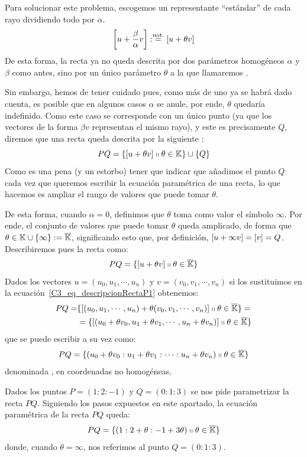 Para solucionar este problema, escogemos un representante ``estándar'' de cada rayo dividiendo todo por $\alpha$.
\[\left [ u+\frac{\beta}{\alpha}v \right ]:\stackrel{\textrm{not.}}{=}\left [ u+\theta v \right ]\]
De esta forma, la recta ya no queda descrita por dos parámetros homogéneos $\alpha$ y $\beta$ como antes, sino por un único parámetro $\theta$ a la que llamaremos .
	
Sin embargo, hemos de tener cuidado pues, como más de uno ya se habrá dado cuenta, es posible que en algunos casos $\alpha$ se anule, por ende, $\theta$ quedaría indefinido. Como este caso se corresponde con un único punto (ya que los vectores de la forma $\beta v$ representan el mismo rayo), y este es precisamente $Q$, diremos que una recta queda descrita por la siguiente :
\begin{equation}
	\label{C3_eq_descripcionRecta}
	PQ=\{\left [ u+\theta v \right ]\shortparallel \theta\in\mathbb{K}\}\cup\{Q\}
\end{equation}
Como es una pena (y un estorbo) tener que indicar que añadimos el punto $Q$ cada vez que queremos escribir la ecuación paramétrica de una recta, lo que hacemos es ampliar el rango de valores que puede tomar $\theta$.

De esta forma, cuando $\alpha=0$, definimos que $\theta$ toma como valor el símbolo $\infty$. Por ende, el conjunto de valores que puede tomar $\theta$ queda amplicado, de forma que $\theta\in\mathbb{K}\cup\{\infty\}:=\overline{\mathbb{K}}$, significando esto que, por definición, $\left [ u+\infty v \right ]=\left [ v \right ]=Q$. Describiremos pues la recta como:
\begin{equation}
	\label{C3_eq_descripcionRectaP1}
	PQ=\{\left [ u+\theta v \right ]\shortparallel \theta\in\overline{\mathbb{K}}\}
\end{equation}
Dados los vectores $u=(u_0,u_1,\cdots,u_n)$ y $v=(v_0,v_1,\cdots,v_n)$ si los sustituimos en la ecuación~\eqref{C3_eq_descripcionRectaP1} obtenemos:
\begin{equation*}
	\label{C_3_eq_parametrica_recta}
	\begin{split}
		PQ=&\{\left [ (u_0,u_1,\cdots,u_n)+\theta(v_0,v_1,\cdots,v_n) \right ]\shortparallel \theta\in\overline{\mathbb{K}}\}=\\
		&=\{\left [ (u_0+\theta v_0,u_1+\theta v_1,\cdots,u_n+\theta v_n) \right ]\shortparallel \theta\in\overline{\mathbb{K}}\}
	\end{split}
\end{equation*}
que se puede escribir a su vez como: 
\begin{equation}
	PQ=\{(u_0+\theta v_0:u_1+\theta v_1:\cdots:u_n+\theta v_n)\shortparallel \theta\in\overline{\mathbb{K}}\}
\end{equation}
denominada , en coordenadas no homogéneas.
\begin{exa}
	\label{C3_exa_rectaConcreta}
	Dados los puntos $P=(1:2:-1)$ y $Q=(0:1:3)$ se nos pide parametrizar la recta $PQ$. Siguiendo los pasos expuestos en este apartado, la ecuación paramétrica de la recta $PQ$ queda:
	\[
	PQ=\{(1:2+\theta:-1+3\theta)\shortparallel\theta\in\overline{\mathbb{K}}\}
	\]
	donde, cuando $\theta=\infty$, nos referimos al punto $Q=(0:1:3)$.
\end{exa}

